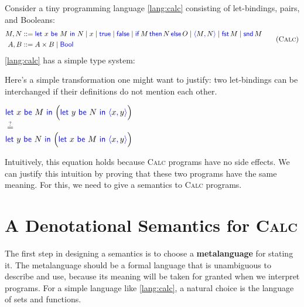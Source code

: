Consider a tiny programming language
\ref{lang:calc} consisting of let-bindings, pairs, and Booleans:
\begin{gather}
  \begin{aligned}
  M,N &::= \pllet{x}{M}{N} \mid x \mid \pltrue{} \mid \plfalse{} \mid \plite{M}{N}{O} \mid \plpair{M}{N} \mid \plfst{M} \mid \plsnd{M} \\
  A,B &::= A \times B \mid \plBool
  \end{aligned}
  \tag{\textsc{Calc}}
  \label{lang:calc}
\end{gather}
\ref{lang:calc} has a simple type system:
Here's a simple transformation one might want to justify: two let-bindings can be interchanged
if their definitions do not mention each other.
\begin{center}
  \(\pllet{x}{M}{\Big( \pllet{y}{N}{\plpair{x}{y}} \Big)}\)\\[0.2em]
  \(\stackrel?=\)\\[0.2em]
  \(\pllet{y}{N}{\Big( \pllet{x}{M}{\plpair{x}{y}} \Big)}\)
\end{center}
Intuitively, this equation holds because
\textsc{Calc} programs have no side effects.
We can justify this intuition by proving that these two programs
have the same meaning. For this, we need to give a
semantics to \textsc{Calc} programs.

\section{A Denotational Semantics for \textsc{Calc}} \label{sec:calc-in-finset}
The first step in designing a semantics is to choose a \textbf{metalanguage} for
stating it.  The metalanguage should be a formal language that is
unambiguous to describe and use, because its meaning will be taken for granted
when we interpret programs.  For a simple language like \ref{lang:calc}, a
natural choice is the language of sets and functions.

